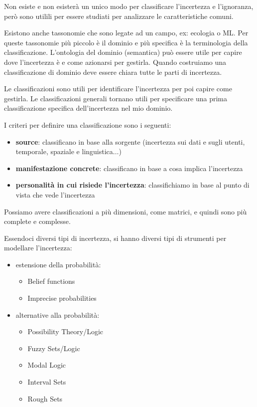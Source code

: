 Non esiste e non esisterà un unico modo per classificare l'incertezza e l'ignoranza, 
però sono utilili per essere studiati per analizzare le caratteristiche comuni.

Esistono anche tassonomie che sono legate ad un campo, ex: ecologia o ML. Per
queste tassonomie più piccolo è il dominio e più specifica è la terminologia della
classificazione. L'ontologia del dominio (semantica) può essere utile per capire dove l'incertezza
è e come azionarsi per gestirla. Quando costruiamo una classificazione di dominio
deve essere chiara tutte le parti di incertezza.

Le classificazioni sono utili per identificare l'incertezza per poi capire come 
gestirla. Le classificazioni generali tornano utili per specificare una prima classificazione 
specifica dell'incertezza nel mio dominio.

I criteri per definire una classificazione sono i seguenti:
\begin{itemize}
    \item \textbf{source}:  classificano in base alla sorgente (incertezza 
    sui dati e sugli utenti, temporale, spaziale e linguistica$\dots$)
    \item \textbf{manifestazione concrete}: classificano in base a cosa implica l'incertezza
    \item \textbf{personalità in cui risiede l'incertezza}: classifichiamo in base
    al punto di vista che vede l'incertezza
\end{itemize}

Possiamo avere classificazioni a più dimensioni, come matrici, e quindi sono più
complete e complesse. 

Essendoci diversi tipi di incertezza, si hanno diversi tipi di strumenti per 
modellare l'incertezza:
\begin{itemize}
    \item estensione della probabilità:
     \begin{itemize}
        \item Belief functions
        \item Imprecise probabilities
    \end{itemize}
    \item alternative alla probabilità:
    \begin{itemize}
        \item Possibility Theory/Logic
        \item Fuzzy Sets/Logic
        \item Modal Logic
        \item Interval Sets
        \item Rough Sets
    \end{itemize}
\end{itemize}

